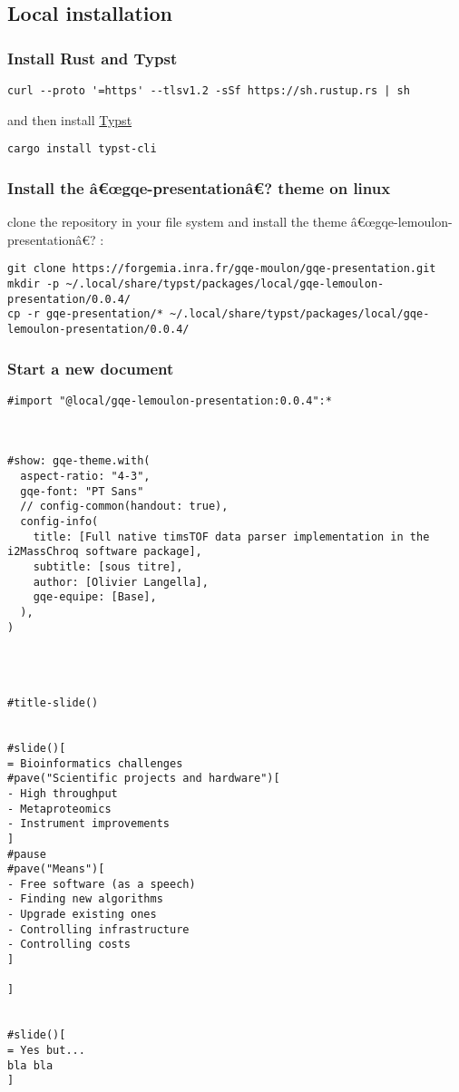 \subsection{Local installation}\label{local-installation}

\subsubsection{Install Rust and Typst}\label{install-rust-and-typst}

\begin{verbatim}
curl --proto '=https' --tlsv1.2 -sSf https://sh.rustup.rs | sh
\end{verbatim}

and then install
\href{https://github.com/typst/typst\#installation}{Typst}

\begin{verbatim}
cargo install typst-cli
\end{verbatim}

\subsubsection{Install the â€œgqe-presentationâ€? theme on
linux}\label{install-the-uxe2ux153gqe-presentationuxe2-theme-on-linux}

clone the repository in your file system and install the theme
â€œgqe-lemoulon-presentationâ€? :

\begin{verbatim}
git clone https://forgemia.inra.fr/gqe-moulon/gqe-presentation.git
mkdir -p ~/.local/share/typst/packages/local/gqe-lemoulon-presentation/0.0.4/
cp -r gqe-presentation/* ~/.local/share/typst/packages/local/gqe-lemoulon-presentation/0.0.4/
\end{verbatim}

\subsubsection{Start a new document}\label{start-a-new-document}

\begin{verbatim}
#import "@local/gqe-lemoulon-presentation:0.0.4":*



#show: gqe-theme.with(
  aspect-ratio: "4-3",
  gqe-font: "PT Sans"
  // config-common(handout: true),
  config-info(
    title: [Full native timsTOF data parser implementation in the i2MassChroq software package],
    subtitle: [sous titre],
    author: [Olivier Langella],
    gqe-equipe: [Base],
  ),
)




#title-slide()


#slide()[
= Bioinformatics challenges
#pave("Scientific projects and hardware")[
- High throughput
- Metaproteomics
- Instrument improvements
]
#pause
#pave("Means")[
- Free software (as a speech)
- Finding new algorithms
- Upgrade existing ones
- Controlling infrastructure
- Controlling costs
]

]


#slide()[
= Yes but...
bla bla
]
\end{verbatim}

